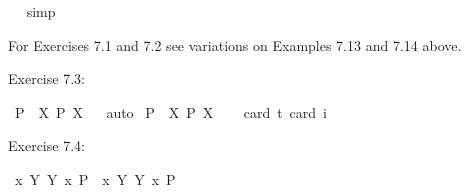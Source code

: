 \begin{isabellebody}
\isadelimproof
\ %
\endisadelimproof
%
\isatagproof
{}\isamarkupfalse%
\ simp%
\endisatagproof
{\isafoldproof}%
%
\isadelimproof
%
\endisadelimproof
%
\isamarkuptrue%
%
\begin{isamarkuptext}%
For Exercises 7.1 and 7.2 see variations on Examples 7.13 and 7.14 above.%
\end{isamarkuptext}\isamarkuptrue%
%
\begin{isamarkuptext}%
Exercise 7.3:%
\end{isamarkuptext}\isamarkuptrue%
\isamarkupfalse%
\ {\isachardoublequoteopen}{\isasymlfloor}\isactrlbold {\isasymdiamond}\isactrlbold {\isasymexists}{\isacharparenleft}P{\isacharcolon}{\isacharcolon}{\isasymup}{\isasymlangle}{\isasymzero}{\isasymrangle}{\isacharparenright}\ \isactrlbold {\isasymrightarrow}\ {\isacharparenleft}\isactrlbold {\isasymexists}X{\isacharcolon}{\isacharcolon}{\isasymup}{\isasymzero}{\isachardot}\ \isactrlbold {\isasymdiamond}{\isacharparenleft}P\ \isactrlbold {\isasymdownharpoonleft}X{\isacharparenright}{\isacharparenright}{\isasymrfloor}{\isachardoublequoteclose}%
\isadelimproof
\ %
\endisadelimproof
%
\isatagproof
{}\isamarkupfalse%
\ auto%
\endisatagproof
{\isafoldproof}%
%
\isadelimproof
%
\endisadelimproof
\isanewline
{}\isamarkupfalse%
\ {\isachardoublequoteopen}{\isasymlfloor}\isactrlbold {\isasymdiamond}\isactrlbold {\isasymexists}{\isacharparenleft}P{\isacharcolon}{\isacharcolon}{\isasymup}{\isasymlangle}{\isasymup}{\isasymlangle}{\isasymzero}{\isasymrangle}{\isasymrangle}{\isacharparenright}\ \isactrlbold {\isasymrightarrow}\ {\isacharparenleft}\isactrlbold {\isasymexists}X{\isacharcolon}{\isacharcolon}{\isasymup}{\isasymlangle}{\isasymzero}{\isasymrangle}{\isachardot}\ \isactrlbold {\isasymdiamond}{\isacharparenleft}P\ \isactrlbold {\isasymdown}X{\isacharparenright}{\isacharparenright}{\isasymrfloor}{\isachardoublequoteclose}\ \isanewline
\ \ \isamarkupfalse%
{\isacharbrackleft}card\ {\isacharprime}t{\isacharequal}{}{\isacharcomma}\ card\ i{\isacharequal}{}{\isacharbrackright}%
\isadelimproof
\ %
\endisadelimproof
%
\isatagproof
{}\isamarkupfalse%
\ %
%
\endisatagproof
{\isafoldproof}%
%
\isadelimproof
%
\endisadelimproof
%
\begin{isamarkuptext}%
Exercise 7.4:%
\end{isamarkuptext}\isamarkuptrue%
\isamarkupfalse%
\ {\isachardoublequoteopen}{\isasymlfloor}\isactrlbold {\isasymdiamond}{\isacharparenleft}\isactrlbold {\isasymexists}x{\isacharcolon}{\isacharcolon}{\isasymzero}{\isachardot}\ {\isacharparenleft}{\isasymlambda}Y{\isachardot}\ Y\ x{\isacharparenright}\ \isactrlbold {\isasymdown}{\isacharparenleft}P{\isacharcolon}{\isacharcolon}{\isasymup}{\isasymlangle}{\isasymzero}{\isasymrangle}{\isacharparenright}{\isacharparenright}\ \isactrlbold {\isasymrightarrow}\ {\isacharparenleft}\isactrlbold {\isasymexists}x{\isachardot}\ {\isacharparenleft}{\isasymlambda}Y{\isachardot}\ \isactrlbold {\isasymdiamond}{\isacharparenleft}Y\ x{\isacharparenright}{\isacharparenright}\ \isactrlbold {\isasymdown}P{\isacharparenright}{\isasymrfloor}{\isachardoublequoteclose}\ \isanewline

\end{isabellebody}
